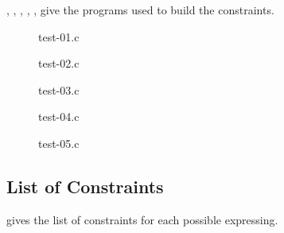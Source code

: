 , , , , , give the programs used to build the constraints.
 
\begin{figure}
\label{fig:test-01}

\caption{test-01.c}
\end{figure}

\begin{figure}
\label{fig:test-02}

\caption{test-02.c}
\end{figure}

\begin{figure}
\label{fig:test-03}

\caption{test-03.c}
\end{figure}

\begin{figure}
\label{fig:test-04}

\caption{test-04.c}
\end{figure}

\begin{figure}
\label{fig:test-05}

\caption{test-05.c}
\end{figure}

\subsection{List of Constraints}
 gives the list of constraints for each possible expressing.

